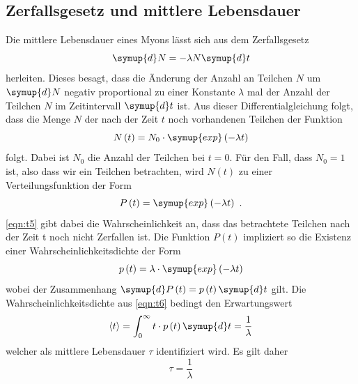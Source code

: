 \subsection{Zerfallsgesetz und mittlere Lebensdauer}
Die mittlere Lebensdauer eines Myons lässt sich aus dem Zerfallsgesetz 
\begin{equation}
    \label{eqn:t3}
    \symup{d}N = - \lambda N \symup{d}t
\end{equation}
herleiten. Dieses besagt, dass die Änderung der Anzahl an Teilchen $N$ um $\symup{d}N$ negativ proportional zu einer Konstante $\lambda$ mal der Anzahl der Teilchen $N$ im Zeitintervall $\symup{d}t$ ist. Aus dieser Differentialgleichung folgt, dass die Menge $N$ der nach der Zeit $t$ noch vorhandenen Teilchen der Funktion
\begin{equation}
    \label{eqn:t4}
    N\left(t\right) = N_0 \cdot \symup{exp} \left( -\lambda t \right)
\end{equation}
folgt. Dabei ist $N_0$ die Anzahl der Teilchen bei $t = 0$. Für den Fall, dass $N_0 = 1$ ist, also dass wir ein Teilchen betrachten, wird $N\left(t\right)$ zu einer Verteilungsfunktion der Form 
\begin{equation}
    \label{eqn:t5}
    P\left(t\right) = \symup{exp} \left( -\lambda t \right) \, \, .
\end{equation}
\autoref{eqn:t5} gibt dabei die Wahrscheinlichkeit an, dass das betrachtete Teilchen nach der Zeit t noch nicht Zerfallen ist. Die Funktion $P\left(t\right)$ impliziert so die Existenz einer Wahrscheinlichkeitsdichte der Form
\begin{equation}
    \label{eqn:t6}
    p\left(t\right) = \lambda \cdot \symup{exp} \left( -\lambda t \right) 
\end{equation}
wobei der Zusammenhang $\symup{d}P\left(t\right) = p \left(t\right) \symup{d}t$ gilt.
Die Wahrscheinlichkeitsdichte aus \autoref{eqn:t6} bedingt den Erwartungswert
\begin{equation}
    \label{eqn:t7}
    \langle t \rangle  = \int_0^{\infty} t \cdot p\left(t\right) \symup{d}t = \frac{1}{\lambda}
\end{equation}
welcher als mittlere Lebensdauer $\tau$ identifiziert wird. Es gilt daher 
\begin{equation}
    \label{eqn:t8}
    \tau = \frac{1}{\lambda}
\end{equation}
\newpage
